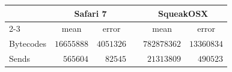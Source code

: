 {\footnotesize
\begin{tabular}{lrrcrr}
\toprule
\multicolumn{1}{l}{\bfseries  }&\multicolumn{2}{c}{\bfseries Safari 7}&\multicolumn{1}{c}{\bfseries }&\multicolumn{2}{c}{\bfseries SqueakOSX}\tabularnewline
\cline{2-3} \cline{5-6}
\multicolumn{1}{l}{}&\multicolumn{1}{c}{mean}&\multicolumn{1}{c}{error}&\multicolumn{1}{c}{}&\multicolumn{1}{c}{mean}&\multicolumn{1}{c}{error}\tabularnewline
\midrule
Bytecodes&$16655888$&$4051326$&&$782878362$&$13360834$\tabularnewline
Sends&$  565604$&$  82545$&&$ 21313809$&$  490523$\tabularnewline
\bottomrule
\end{tabular}}
